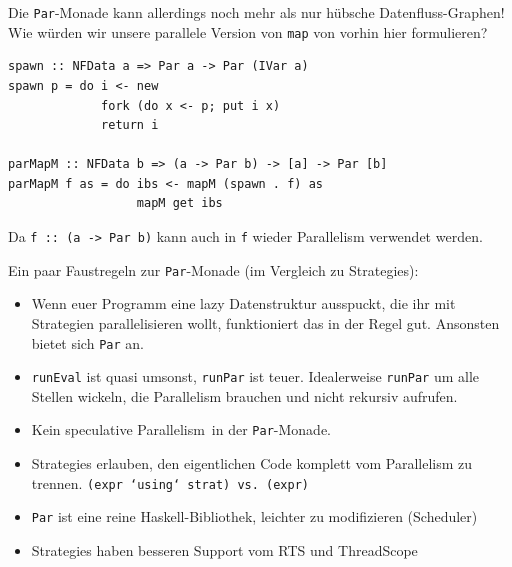 \documentclass{beamer}
\begin{document}

\begin{frame}[fragile]

Die \texttt{Par}-Monade kann allerdings noch mehr als nur hübsche Datenfluss-Graphen!
Wie würden wir unsere parallele Version von \texttt{map} von vorhin hier formulieren?\pause

\begin{verbatim}
spawn :: NFData a => Par a -> Par (IVar a)
spawn p = do i <- new
             fork (do x <- p; put i x)
             return i
  
parMapM :: NFData b => (a -> Par b) -> [a] -> Par [b]
parMapM f as = do ibs <- mapM (spawn . f) as
                  mapM get ibs
\end{verbatim}
\pause

Da \texttt{f :: (a -> Par b)} kann auch in \texttt{f} wieder Parallelism verwendet werden.

\end{frame}


\begin{frame}
Ein paar Faustregeln zur \texttt{Par}-Monade (im Vergleich zu Strategies):\bigskip\pause
\begin{itemize}
\item Wenn euer Programm eine lazy Datenstruktur ausspuckt, die ihr mit Strategien parallelisieren wollt, funktioniert das in der Regel gut. Ansonsten bietet sich \texttt{Par} an.\pause
\item \texttt{runEval} ist quasi umsonst, \texttt{runPar} ist teuer. Idealerweise \texttt{runPar} um alle Stellen wickeln, die Parallelism brauchen und nicht rekursiv aufrufen.\pause
\item Kein \glqq speculative Parallelism\grqq\ in der \texttt{Par}-Monade.\pause
\item Strategies erlauben, den eigentlichen Code komplett vom Parallelism zu trennen.
\texttt{(expr `using` strat) vs. (expr)}\pause
\item \texttt{Par} ist eine reine Haskell-Bibliothek, leichter zu modifizieren (Scheduler)\pause
\item Strategies haben besseren Support vom RTS und ThreadScope
\end{itemize}
\end{frame}
\end{document}
